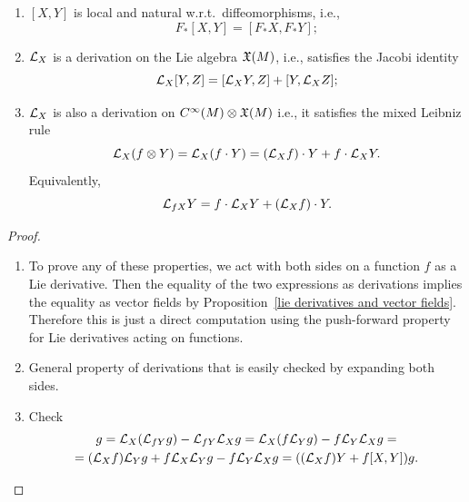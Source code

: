 \begin{prop}\label{prop properties of Lie derivatives}
\begin{enumerate}
    \item $[X,Y]$ is local and natural w.r.t.\ diffeomorphisms, i.e., \[F_\ast [X,Y]=[F_\ast X,F_\ast Y];\]
    \item $\mathcal{L}_X$ is a derivation on the Lie algebra $\mathfrak{X}(M)$, i.e., satisfies the Jacobi identity
    \[\mathcal{L}_X [Y,Z]=[\mathcal{L}_X Y,Z]+[Y,\mathcal{L}_X Z];\]
    \item $\mathcal{L}_X$ is also a derivation on $C^\infty(M)\otimes \mathfrak{X}(M)$ i.e., it satisfies the mixed Leibniz rule
    \[\mathcal{L}_X(f\otimes Y)=\mathcal{L}_X(f\cdot Y)=(\mathcal{L}_X f)\cdot Y+f\cdot \mathcal{L}_X Y.\]
    Equivalently, 
    \[\mathcal{L}_{fX}Y=f\cdot \mathcal{L}_X Y+\left(\mathcal{L}_X f\right)\cdot Y.\label{Lie derivative not covariant}\]
\end{enumerate}
\end{prop}
\begin{proof}
    \begin{enumerate}
        \item To prove any of these properties, we act with both sides on a function $f$ as a Lie derivative. Then the equality of the two expressions as derivations implies the equality as vector fields by Proposition~\ref{lie derivatives and vector fields}. Therefore this is just a direct computation using the push-forward property for Lie derivatives acting on functions.
        \item General property of derivations that is easily checked by expanding both sides.
        \item Check 
        \begin{multline}
            [X,fY]g=\Lie_X (\Lie_{fY}g)-\Lie_{fY}\Lie_X g=\Lie_X (f\Lie_Y g)-f\Lie_Y \Lie_X g=\\=(\Lie_X f)\Lie_Y g+f\Lie_X\Lie_Y g-f\Lie_Y\Lie_X g=((\Lie_X f)Y+f[X,Y])g.
        \end{multline}
    \end{enumerate}
\end{proof}


